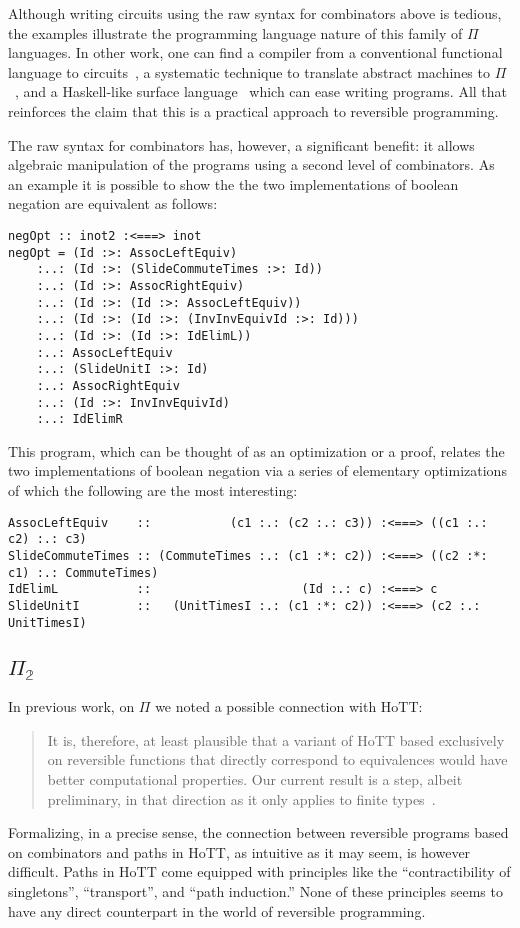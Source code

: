 \documentclass{entcs}
\begin{document}
Although writing circuits using the raw syntax for combinators above is tedious,
the examples illustrate the programming language nature of this family of $\Pi$
languages. In other work, one can find a compiler from a conventional functional
language to circuits~\cite{James:2012:IE:2103656.2103667}, a systematic
technique to translate abstract machines to $\Pi$~\cite{rc2012}, and a
Haskell-like surface language~\cite{theseus} which can ease writing
programs. All that reinforces the claim that this is a practical approach to
reversible programming.

The raw syntax for combinators has, however, a significant benefit: it allows
algebraic manipulation of the programs using a second level of combinators. As
an example it is possible to show the the two implementations of boolean
negation are equivalent as follows:

{\footnotesize
\begin{verbatim}
negOpt :: inot2 :<===> inot
negOpt = (Id :>: AssocLeftEquiv)
    :..: (Id :>: (SlideCommuteTimes :>: Id))
    :..: (Id :>: AssocRightEquiv)
    :..: (Id :>: (Id :>: AssocLeftEquiv))
    :..: (Id :>: (Id :>: (InvInvEquivId :>: Id)))
    :..: (Id :>: (Id :>: IdElimL))
    :..: AssocLeftEquiv
    :..: (SlideUnitI :>: Id)
    :..: AssocRightEquiv
    :..: (Id :>: InvInvEquivId)
    :..: IdElimR
\end{verbatim}}
%
\noindent This program, which can be thought of as an optimization or a proof, relates the
two implementations of boolean negation via a series of elementary
optimizations of which the following are the most interesting:

{\footnotesize
\begin{verbatim}
AssocLeftEquiv    ::           (c1 :.: (c2 :.: c3)) :<===> ((c1 :.: c2) :.: c3)
SlideCommuteTimes :: (CommuteTimes :.: (c1 :*: c2)) :<===> ((c2 :*: c1) :.: CommuteTimes)
IdElimL           ::                     (Id :.: c) :<===> c
SlideUnitI        ::   (UnitTimesI :.: (c1 :*: c2)) :<===> (c2 :.: UnitTimesI)
\end{verbatim}}

\subsection{$\Pi_{\mathbb{2}}$}

In previous work, on $\Pi$ we noted a possible connection with HoTT:
\begin{quote}
  It is, therefore, at least plausible that a variant of HoTT based exclusively
  on reversible functions that directly correspond to equivalences would have
  better computational properties. Our current result is a step, albeit
  preliminary, in that direction as it only applies to finite
  types~\cite{Carette2016}.
\end{quote}
Formalizing, in a precise sense, the connection between reversible programs
based on combinators and paths in HoTT, as intuitive as it may seem, is however
difficult. Paths in HoTT come equipped with principles like the
``contractibility of singletons'', ``transport'', and ``path induction.'' None
of these principles seems to have any direct counterpart in the world of
reversible programming.
\end{document}
